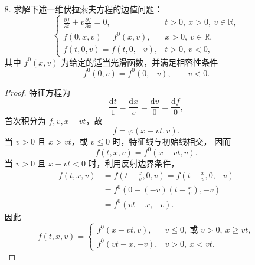 \begin{itemize}
    \begin{proof}
    特征方程为
    $$
    \frac{\mathrm dt}{1}
    =\frac{\mathrm dx}{v}
    =\frac{\mathrm dv}{g}
    =\frac{\mathrm df}{0}.
    $$
    显然有首次积分 $f$ 与 $v-gt$，并且
    $$
    \frac{\mathrm dx}{v}
    =\frac{\mathrm dv}{g}
    \quad\Longrightarrow\quad
    x-\frac{v^2}{2g}
    $$
    也是首次积分。因此通解为
    $$
    f=\varphi\left(
    x-\frac{v^2}{2g},v-gt
    \right).
    $$
    当 $t=0$ 时，
    $$
    \varphi\left(x-\frac{v^2}{2g},v\right)
    =f^0(x,v),
    $$
    从而
    $$
    \varphi(\xi,v)
    =f^0\left(\xi+\frac{v^2}{2g},v\right).
    $$
    故
    $$
    \begin{aligned}
    f(t,x,v)
    &=f^0\left(
    x-\frac{v^2}{2g}
    +\frac{(v-gt)^2}{2g},v-gt
    \right)\\
    &=f^0\left(
    x-vt+\frac{1}{2}gt^2,v-gt
    \right).
    \end{aligned}
    $$
    \end{proof}

    \item[8.]求解下述一维伏拉索夫方程的边值问题：
    $$
    \begin{cases}
    \displaystyle
    \frac{\partial f}{\partial t}
    +v\frac{\partial f}{\partial x}=0,
    &t>0,\ x>0,\ v\in\mathbb R,\\[2mm]
    f(0,x,v)=f^0(x,v),
    &x>0,\ v\in\mathbb R,\\[2mm]
    f(t,0,v)=f(t,0,-v),
    &t>0,\ v<0,
    \end{cases}
    $$
    其中 $f^0(x,v)$ 为给定的适当光滑函数，并满足相容性条件
    $$
    f^0(0,v)=f^0(0,-v),\qquad v<0.
    $$

    \begin{proof}
    特征方程为
    $$
    \frac{\mathrm dt}{1}
    =\frac{\mathrm dx}{v}
    =\frac{\mathrm dv}{0}
    =\frac{\mathrm df}{0},
    $$
    首次积分为 $f,v,x-vt$，故
    $$
    f=\varphi(x-vt,v).
    $$
    当 $v>0$ 且 $x>vt$，或 $v\leq0$ 时，特征线与初始线相交，
    因而
    $$
    f(t,x,v)=f^0(x-vt,v).
    $$
    当 $v>0$ 且 $x-vt<0$ 时，利用反射边界条件，
    $$
    \begin{aligned}
    f(t,x,v)
    &=f\left(t-\frac{x}{v},0,v\right)
    =f\left(t-\frac{x}{v},0,-v\right)\\
    &=f^0\left(
    0-(-v)\left(t-\frac{x}{v}\right),-v
    \right)\\
    &=f^0(vt-x,-v).
    \end{aligned}
    $$
    因此
    $$
    f(t,x,v)=
    \begin{cases}
    f^0(x-vt,v),
    &v\leq0,\ \text{或 }v>0,\ x\geq vt,\\[1mm]
    f^0(vt-x,-v),
    &v>0,\ x<vt.
    \end{cases}
    $$
    \end{proof}
\end{itemize}